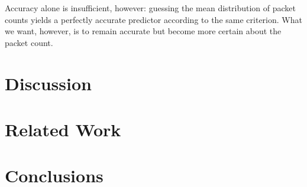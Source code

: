 \documentclass[conference]{IEEEtran}
\begin{document}
Accuracy alone is insufficient, however:
guessing the mean distribution of packet counts yields a perfectly accurate predictor according to the same criterion.
What we want, however, is to remain accurate but become more certain about the packet count.


\section{Discussion}

\section{Related Work}

\section{Conclusions}


\end{document}
